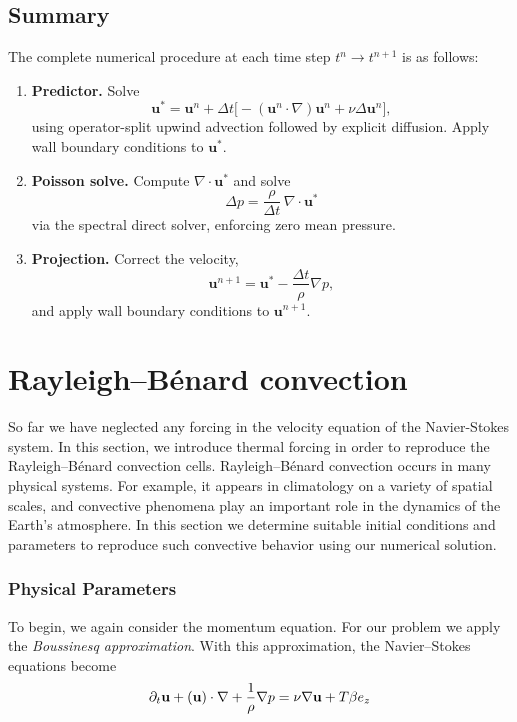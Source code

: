 \subsection{Summary}
The complete numerical procedure at each time step $t^n \to t^{n+1}$
is as follows:
\begin{enumerate}
    \item \textbf{Predictor.} Solve
          \begin{equation*}
              \mathbf{u}^* = \mathbf{u}^n + \Delta t\bigl[
              -(\mathbf{u}^n\cdot\nabla)\mathbf{u}^n
              + \nu\Delta\mathbf{u}^n\bigr],
          \end{equation*}
          using operator-split upwind advection followed by explicit
          diffusion. Apply wall boundary conditions to $\mathbf{u}^*$.
    \item \textbf{Poisson solve.} Compute
          $\nabla\cdot\mathbf{u}^*$ and solve
          \begin{equation*}
              \Delta p = \frac{\rho}{\Delta t}\,\nabla\cdot\mathbf{u}^*
          \end{equation*}
          via the spectral direct solver, enforcing zero mean pressure.
    \item \textbf{Projection.} Correct the velocity,
          \begin{equation*}
              \mathbf{u}^{n+1} = \mathbf{u}^*
              - \frac{\Delta t}{\rho}\nabla p,
          \end{equation*}
          and apply wall boundary conditions to $\mathbf{u}^{n+1}$.
\end{enumerate}

\section{Rayleigh--Bénard convection}
So far we have neglected any forcing in the velocity equation of the
Navier-Stokes system. In this section, we introduce thermal forcing in
order to reproduce the Rayleigh--Bénard convection cells. Rayleigh--Bénard
convection occurs in many physical systems. For example, it appears in
climatology on a variety of spatial scales, and convective phenomena play
an important role in the dynamics of the Earth's atmosphere. In this
section we determine suitable initial conditions and parameters to
reproduce such convective behavior using our numerical solution.

\subsubsection{Physical Parameters}
To begin, we again consider the momentum equation. For our problem we
apply the \textit{Boussinesq approximation}.  With this approximation, the Navier--Stokes equations
become
$$\partial_t \textbf{u} + (\textbf{u})\cdot \nabla 
+ \frac{1}{\rho}\nabla p = \nu \nabla \textbf u + T \beta e_z $$

